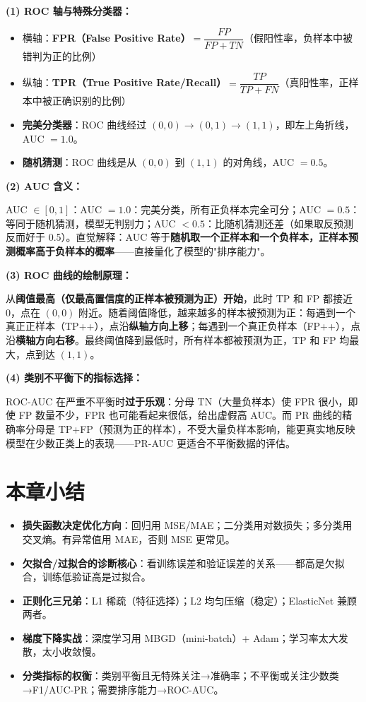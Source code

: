 \documentclass[a4paper,11pt]{ctexart}
\begin{document}
\begin{solutionbox}[参考答案与详细解析]
    \textbf{(1) ROC 轴与特殊分类器：}

    \begin{itemize}
        \item 横轴：\textbf{FPR（False Positive Rate）}$= \dfrac{FP}{FP+TN}$（假阳性率，负样本中被错判为正的比例）
        \item 纵轴：\textbf{TPR（True Positive Rate/Recall）}$= \dfrac{TP}{TP+FN}$（真阳性率，正样本中被正确识别的比例）
        \item \textbf{完美分类器}：ROC 曲线经过 $(0,0) \to (0,1) \to (1,1)$，即左上角折线，AUC $= 1.0$。
        \item \textbf{随机猜测}：ROC 曲线是从 $(0,0)$ 到 $(1,1)$ 的对角线，AUC $= 0.5$。
    \end{itemize}

    \textbf{(2) AUC 含义：}

    AUC $\in [0, 1]$：AUC $= 1.0$：完美分类，所有正负样本完全可分；AUC $= 0.5$：等同于随机猜测，模型无判别力；AUC $< 0.5$：比随机猜测还差（如果取反预测反而好于 0.5）。直觉解释：AUC 等于\textbf{随机取一个正样本和一个负样本，正样本预测概率高于负样本的概率}——直接量化了模型的"排序能力"。

    \textbf{(3) ROC 曲线的绘制原理：}

    从\textbf{阈值最高（仅最高置信度的正样本被预测为正）开始}，此时 TP 和 FP 都接近 0，点在 $(0,0)$ 附近。随着阈值降低，越来越多的样本被预测为正：每遇到一个真正正样本（TP++），点沿\textbf{纵轴方向上移}；每遇到一个真正负样本（FP++），点沿\textbf{横轴方向右移}。最终阈值降到最低时，所有样本都被预测为正，TP 和 FP 均最大，点到达 $(1,1)$。

    \textbf{(4) 类别不平衡下的指标选择：}

    \begin{keybox}
        ROC-AUC 在严重不平衡时\textbf{过于乐观}：分母 TN（大量负样本）使 FPR 很小，即使 FP 数量不少，FPR 也可能看起来很低，给出虚假高 AUC。而 PR 曲线的精确率分母是 TP+FP（预测为正的样本），不受大量负样本影响，能更真实地反映模型在少数正类上的表现——PR-AUC 更适合不平衡数据的评估。
    \end{keybox}
\end{solutionbox}

\section{本章小结}
\begin{itemize}
    \item \textbf{损失函数决定优化方向}：回归用 MSE/MAE；二分类用对数损失；多分类用交叉熵。有异常值用 MAE，否则 MSE 更常见。
    \item \textbf{欠拟合/过拟合的诊断核心}：看训练误差和验证误差的关系——都高是欠拟合，训练低验证高是过拟合。
    \item \textbf{正则化三兄弟}：L1 稀疏（特征选择）；L2 均匀压缩（稳定）；ElasticNet 兼顾两者。
    \item \textbf{梯度下降实战}：深度学习用 MBGD（mini-batch）+ Adam；学习率太大发散，太小收敛慢。
    \item \textbf{分类指标的权衡}：类别平衡且无特殊关注→准确率；不平衡或关注少数类→F1/AUC-PR；需要排序能力→ROC-AUC。
\end{itemize}
\end{document}

